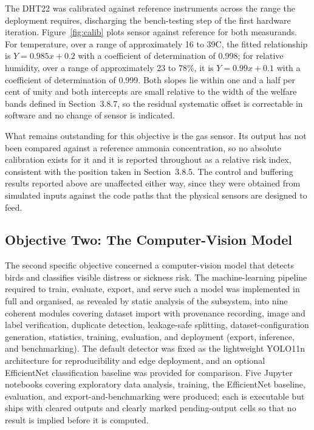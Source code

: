 \documentclass[12pt,a4paper]{report}
\begin{document}
The DHT22 was calibrated against reference instruments across the range the deployment requires, discharging the bench-testing step of the first hardware iteration. Figure~\ref{fig:calib} plots sensor against reference for both measurands. For temperature, over a range of approximately 16 to 39\textdegree C, the fitted relationship is $Y = 0.985x + 0.2$ with a coefficient of determination of 0.998; for relative humidity, over a range of approximately 23 to 78\%, it is $Y = 0.99x + 0.1$ with a coefficient of determination of 0.999. Both slopes lie within one and a half per cent of unity and both intercepts are small relative to the width of the welfare bands defined in Section~3.8.7, so the residual systematic offset is correctable in software and no change of sensor is indicated.

What remains outstanding for this objective is the gas sensor. Its output has not been compared against a reference ammonia concentration, so no absolute calibration exists for it and it is reported throughout as a relative risk index, consistent with the position taken in Section~3.8.5. The control and buffering results reported above are unaffected either way, since they were obtained from simulated inputs against the code paths that the physical sensors are designed to feed.

\subsection{Objective Two: The Computer-Vision Model}

The second specific objective concerned a computer-vision model that detects birds and classifies visible distress or sickness risk. The machine-learning pipeline required to train, evaluate, export, and serve such a model was implemented in full and organised, as revealed by static analysis of the subsystem, into nine coherent modules covering dataset import with provenance recording, image and label verification, duplicate detection, leakage-safe splitting, dataset-configuration generation, statistics, training, evaluation, and deployment (export, inference, and benchmarking). The default detector was fixed as the lightweight YOLO11n architecture for reproducibility and edge deployment, and an optional EfficientNet classification baseline was provided for comparison. Five Jupyter notebooks covering exploratory data analysis, training, the EfficientNet baseline, evaluation, and export-and-benchmarking were produced; each is executable but ships with cleared outputs and clearly marked pending-output cells so that no result is implied before it is computed.
\end{document}
